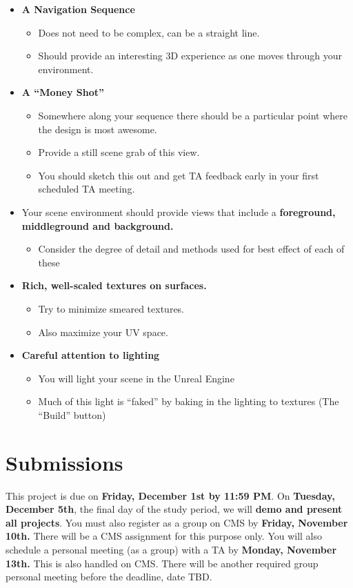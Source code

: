 \documentclass[12pt]{article}
\begin{document}
\begin{itemize}

	\item \textbf{A Navigation Sequence }
	\begin{itemize}
	
		\item Does not need to be complex, can be a straight line.
		\item Should provide an interesting 3D experience as one moves through your environment.
	\end{itemize}
	\item \textbf{A “Money Shot” }
	\begin{itemize}
	
		\item Somewhere along your sequence there should be a particular point where the design is most awesome.
		\item Provide a still scene grab of this view. 
		\item You should sketch this out and get TA feedback early in your first scheduled TA meeting.
	\end{itemize}
	\item Your scene environment should provide views that include a \textbf{foreground, middleground and background.} 
	\begin{itemize}
	
		\item Consider the degree of detail and methods used for best effect of each of these
	\end{itemize}
	\item \textbf{ Rich, well-scaled textures on surfaces. }
	\begin{itemize}
	
		\item Try to minimize smeared textures.
		\item Also maximize your UV space.
	\end{itemize}
	\item \textbf{Careful attention to lighting}
	\begin{itemize}
	
		\item You will light your scene in the Unreal Engine
		\item Much of this light is “faked” by baking in the lighting to textures (The “Build” button)
	\end{itemize}
\end{itemize}

\section{Submissions}
This project is due on \textbf{Friday, December 1st by 11:59 PM}.  On \textbf{Tuesday, December 5th}, the final day of the study period, we will \textbf{demo and present all projects}.  You must also register as a group on CMS by \textbf{Friday, November 10th.}  There will be a CMS assignment for this purpose only.  You will also schedule a personal meeting (as a group) with a TA by \textbf{Monday, November 13th.} This is also handled on CMS.  There will be another required group personal meeting before the deadline, date TBD.
\end{document}
